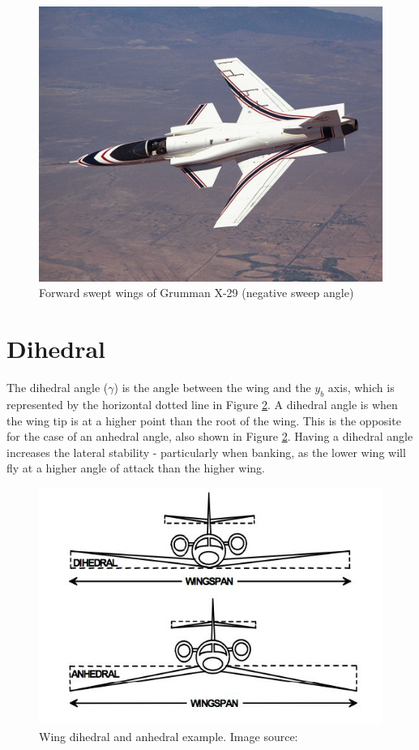 \begin{figure}[H]
  \centering
   \includegraphics[width=1\linewidth]{03_LiteratureReview/Figs/negativeSweep.jpg}
  \caption{Forward swept wings of Grumman X-29 (negative sweep angle) \cite{plane}}
  \label{fig:X29}
\end{figure}

\section{Dihedral}
The dihedral angle ($\gamma$) is the angle between the wing and the $y_b$ axis, which is represented by the horizontal dotted line in Figure \ref{fig:dihedral}. A dihedral angle is when the wing tip is at a higher point than the root of the wing. This is the opposite for the case of an anhedral angle, also shown in Figure \ref{fig:dihedral}. Having a dihedral angle increases the lateral stability - particularly when banking, as the lower wing will fly at a higher angle of attack than the higher wing. 

\begin{figure}[H]
  \centering
   \includegraphics[width=1\linewidth]{03_LiteratureReview/Figs/dihedral.jpg}
  \caption{Wing dihedral and anhedral example. Image source: \cite{moreplane}}
  \label{fig:dihedral}
\end{figure}

